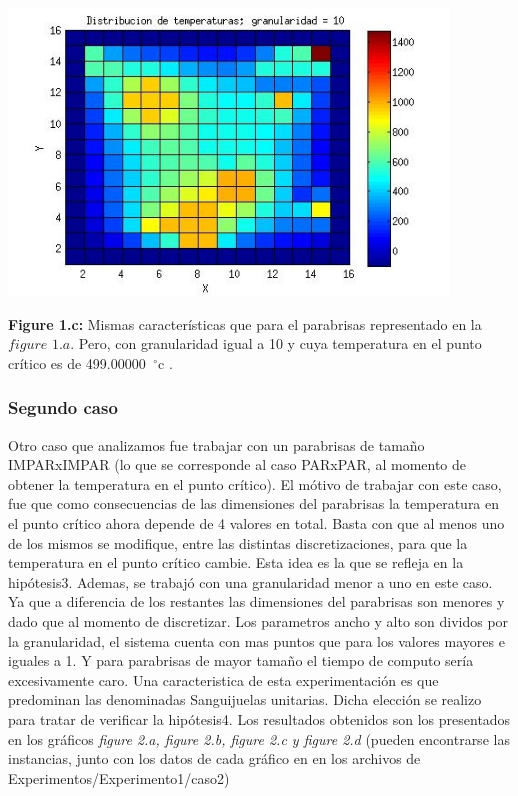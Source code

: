 \includegraphics[width=\textwidth,height=3.0in,keepaspectratio
]{140x140h10.jpg} \newline
\begin {flushleft}
\textbf{Figure 1.c:} Mismas características que para el parabrisas representado en la $figure$ $1.a$. Pero, con granularidad igual a 10 y cuya temperatura en el punto crítico es de 499.00000\hspace{-1.5mm}$\phantom{a}^{\circ}$c .
\end{flushleft}


\subsubsection{Segundo caso}



Otro caso que analizamos fue trabajar con un parabrisas de tamaño IMPARxIMPAR (lo que se corresponde al caso PARxPAR, al momento de obtener la temperatura en el punto crítico). El mótivo de trabajar con este caso, fue que como consecuencias de las dimensiones del parabrisas la temperatura en el punto crítico ahora depende de 4 valores en total. Basta con que al menos uno de los mismos se modifique, entre las distintas discretizaciones, para que la temperatura en el punto crítico cambie. Esta idea es la que se refleja en la hipótesis3.\newline
Ademas, se trabajó con una granularidad menor a uno en este caso. Ya que a diferencia de los restantes las dimensiones del parabrisas son menores y dado que al momento de discretizar. Los parametros ancho y alto son dividos por la granularidad, el sistema cuenta con mas puntos que para los valores mayores e iguales a 1. Y para parabrisas de mayor tamaño el tiempo de computo sería excesivamente caro.  
Una caracteristica de esta experimentación es que predominan las denominadas Sanguijuelas unitarias. Dicha elección se realizo para tratar de verificar la hipótesis4. Los resultados obtenidos son los presentados en los gráficos \textit{figure 2.a, figure 2.b, figure 2.c y figure 2.d} (pueden encontrarse las instancias, junto con los datos de cada gráfico en en los archivos de Experimentos/Experimento1/caso2)\newline


